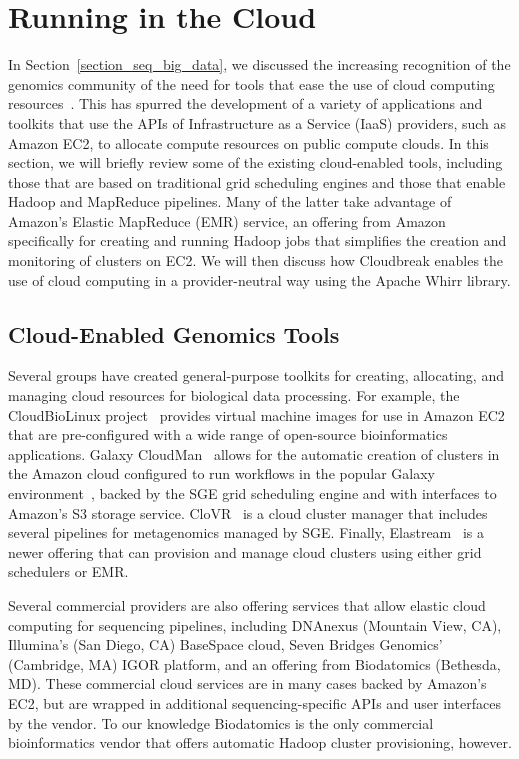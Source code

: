 \section{Running in the Cloud}\label{section_cloud_whirr}

In Section~\ref{section_seq_big_data}, we discussed the increasing recognition of the genomics community of the need for tools that ease the use of cloud computing resources~\cite{Schatz:2010js,Stein:2010gp}. This has spurred the development of a variety of applications and toolkits that use the APIs of Infrastructure as a Service (IaaS) providers, such as Amazon EC2, to allocate compute resources on public compute clouds. In this section, we will briefly review some of the existing cloud-enabled tools, including those that are based on traditional grid scheduling engines and those that enable Hadoop and MapReduce pipelines. Many of the latter take advantage of Amazon's Elastic MapReduce (EMR) service, an offering from Amazon specifically for creating and running Hadoop jobs that simplifies the creation and monitoring of clusters on EC2. We will then discuss how Cloudbreak enables the use of cloud computing in a provider-neutral way using the Apache Whirr library.

\subsection{Cloud-Enabled Genomics Tools}

Several groups have created general-purpose toolkits for creating, allocating, and managing cloud resources for biological data processing. For example, the CloudBioLinux project~\cite{Krampis:2012wo} provides virtual machine images for use in Amazon EC2 that are pre-configured with a wide range of open-source bioinformatics applications. Galaxy CloudMan~\cite{Afgan:2010fa} allows for the automatic creation of clusters in the Amazon cloud configured to run workflows in the popular Galaxy environment~\cite{Giardine:2005ig}, backed by the SGE grid scheduling engine and with interfaces to Amazon's S3 storage service. CloVR~\cite{Angiuoli:2011wl} is a cloud cluster manager that includes several pipelines for metagenomics managed by SGE. Finally, Elastream~\cite{Issa:2013jp} is a newer offering that can provision and manage cloud clusters using either grid schedulers or EMR. 

Several commercial providers are also offering services that allow elastic cloud computing for sequencing pipelines, including DNAnexus (Mountain View, CA), Illumina's (San Diego, CA) BaseSpace cloud, Seven Bridges Genomics' (Cambridge, MA) IGOR platform, and an offering from Biodatomics (Bethesda, MD). These commercial cloud services are in many cases backed by Amazon's EC2, but are wrapped in additional sequencing-specific APIs and user interfaces by the vendor. To our knowledge Biodatomics is the only commercial bioinformatics vendor that offers automatic Hadoop cluster provisioning, however. 

